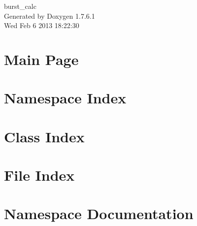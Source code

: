 \documentclass[a4paper]{book}
\begin{document}
\begin{titlepage}
\vspace*{7cm}
\begin{center}
{\Large burst\-\_\-calc }\\
\vspace*{1cm}
{\large \-Generated by Doxygen 1.7.6.1}\\
\vspace*{0.5cm}
{\small Wed Feb 6 2013 18:22:30}\\
\end{center}
\end{titlepage}
\clearemptydoublepage
{}
\tableofcontents
\clearemptydoublepage
{}
\chapter{\-Main \-Page}
\label{index}
\chapter{\-Namespace \-Index}

\chapter{\-Class \-Index}

\chapter{\-File \-Index}

\chapter{\-Namespace \-Documentation}










\end{document}
